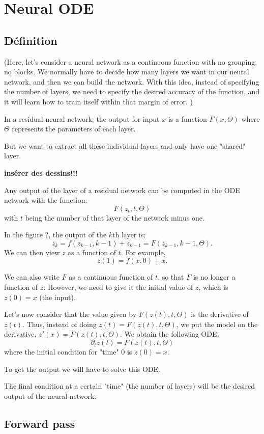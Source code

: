 \documentclass[10pt,a4paper]{article}
\theoremstyle{definition}
\theoremstyle{theorem}
\begin{document}
\section{Neural ODE}

\subsection{Définition}

(Here, let's consider a neural network as a continuous function with no grouping, no blocks.   We normally have to decide how many layers we want in our neural network, and then we can build the network. With this idea, instead of specifying the number of layers, we need to specify the desired accuracy of the function, and it will learn how to train itself within that margin of error. )

In a residual neural network, the output for input $x$ is a function $F(x, \Theta)$ where $\Theta$ represents the parameters of each layer. 

But we want to extract all these individual layers and only have one "shared" layer.

\textbf{insérer des dessins!!!}

Any output of the layer of a residual network can be computed in the ODE network with the function:
$$F(z_t, t, \Theta)$$
with $t$ being the number of that layer of the network minus one.

In the figure ?, the output of the $k$th layer is:
$$z_k = f(z_{k-1}, k-1) + z_{k-1} = F(z_{k-1}, k-1, \Theta).$$
We can then view $z$ as a function of $t$. For example,
$$z(1) = f(x, 0) + x.$$

We can also write $F$ as a continuous function of $t$, so that $F$ is no longer a function of $z$. However, we need to give it the initial value of $z$, which is $z(0) = x$ (the input).

Let's now consider that the value given by $F(z(t), t, \Theta)$ is the derivative of $z(t)$. Thus, instead of doing $z(t) = F(z(t), t, \Theta)$, we put the model on the derivative, $z'(x) = F(z(t), t, \Theta)$.  We obtain the following ODE:
$$ \partial_t z(t) = F(z(t), t, \Theta) $$
where the initial condition for "time" $0$ is $z(0) = x$. 

To get the output we will have to solve this ODE.

The final condition at a certain "time" (the number of layers) will be the desired output of the neural network.


\subsection{Forward pass}
\end{document}
